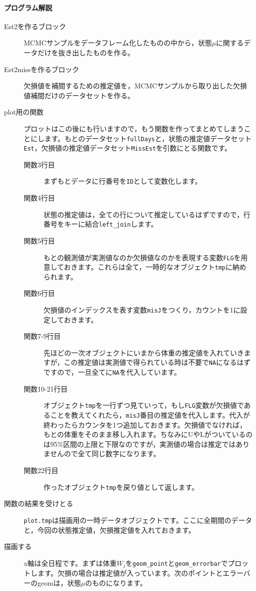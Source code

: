 \documentclass{ltjsbook}
\begin{document}
\paragraph{プログラム解説}
\begin{description}
    \item[Est2を作るブロック] MCMCサンプルをデータフレーム化したものの中から，状態$\mu$に関するデータだけを抜き出したものを作る。
    \item[Est2missを作るブロック] 欠損値を補間するための推定値を，MCMCサンプルから取り出した欠損値補間だけのデータセットを作る。
    \item[plot用の関数] プロットはこの後にも行いますので，もう関数を作ってまとめてしまうことにします。もとのデータセット\verb|fullDays|と，状態の推定値データセット\verb|Est|，欠損値の推定値データセット\verb|MissEst|を引数にとる関数です。
    \begin{description}
        \item[関数3行目] まずもとデータに行番号を\verb|ID|として変数化します。
        \item[関数4行目] 状態の推定値は，全ての行について推定しているはずですので，行番号をキーに結合\verb|left_join|します。
        \item[関数5行目] もとの観測値が実測値なのか欠損値なのかを表現する変数\verb|FLG|を用意しておきます。これらは全て，一時的なオブジェクト\verb|tmp|に納められます。
        \item[関数6行目] 欠損値のインデックスを表す変数\verb|misJ|をつくり，カウントを1に設定しておきます。
        \item[関数7-9行目] 先ほどの一次オブジェクトにいまから体重の推定値を入れていきますが，この推定値は実測値で得られている時は不要で\verb|NA|になるはずですので，一旦全てに\verb|NA|を代入しています。
        \item[関数10-21行目] オブジェクト\verb|tmp|を一行ずつ見ていって，もし\verb|FLG|変数が欠損値であることを教えてくれたら，\verb|misJ|番目の推定値を代入します。代入が終わったらカウンタを1つ追加しておきます。欠損値でなければ，もとの体重をそのまま移し入れます。ちなみにUやLがついているのは95\%区間の上限と下限なのですが，実測値の場合は推定ではありませんので全て同じ数字になります。
        \item[関数22行目] 作ったオブジェクト\verb|tmp|を戻り値として返します。
    \end{description}
    \item[関数の結果を受けとる] \verb|plot.tmp|は描画用の一時データオブジェクトです。ここに全期間のデータと，今回の状態推定値，欠損推定値を入れておきます。
    \item[描画する] x軸は全日程です。まずは体重$W_j$を\verb|geom_point|と\verb|geom_errorbar|でプロットします。欠損の場合は推定値が入っています。次のポイントとエラーバーのgeomは，状態$\mu$のものになります。
\end{description}
\end{document}
